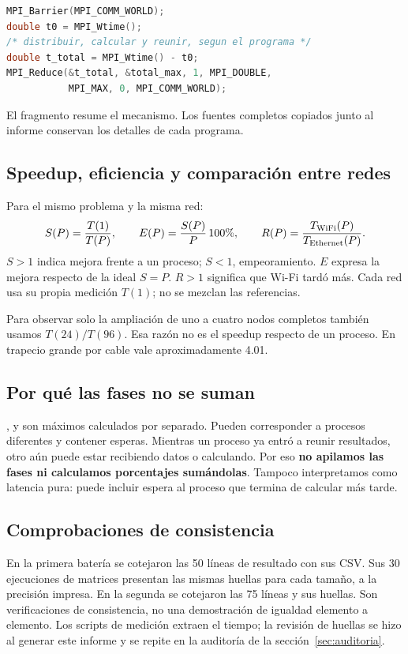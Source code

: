 \begin{lstlisting}[language=C]
MPI_Barrier(MPI_COMM_WORLD);
double t0 = MPI_Wtime();
/* distribuir, calcular y reunir, segun el programa */
double t_total = MPI_Wtime() - t0;
MPI_Reduce(&t_total, &total_max, 1, MPI_DOUBLE,
           MPI_MAX, 0, MPI_COMM_WORLD);
\end{lstlisting}
El fragmento resume el mecanismo. Los fuentes completos copiados junto al informe conservan los detalles de cada programa.

\subsection{Speedup, eficiencia y comparación entre redes}
Para el mismo problema y la misma red:
\[
 S(P)=\frac{T(1)}{T(P)},\qquad
 E(P)=\frac{S(P)}{P}\,100\%,\qquad
 R(P)=\frac{T_{\rm WiFi}(P)}{T_{\rm Ethernet}(P)}.
\]
$S>1$ indica mejora frente a un proceso; $S<1$, empeoramiento. $E$ expresa la mejora respecto de la ideal $S=P$. $R>1$ significa que Wi-Fi tardó más. Cada red usa su propia medición $T(1)$; no se mezclan las referencias.

Para observar solo la ampliación de uno a cuatro nodos completos también usamos $T(24)/T(96)$. Esa razón no es el speedup respecto de un proceso. En trapecio grande por cable vale aproximadamente 4.01.

\subsection{Por qué las fases no se suman}
,  y  son máximos calculados por separado. Pueden corresponder a procesos diferentes y contener esperas. Mientras un proceso ya entró a reunir resultados, otro aún puede estar recibiendo datos o calculando. Por eso \textbf{no apilamos las fases ni calculamos porcentajes sumándolas}. Tampoco interpretamos  como latencia pura: puede incluir espera al proceso que termina de calcular más tarde.

\subsection{Comprobaciones de consistencia}
En la primera batería se cotejaron las 50 líneas de resultado con sus CSV. Sus 30 ejecuciones de matrices presentan las mismas huellas para cada tamaño, a la precisión impresa. En la segunda se cotejaron las 75 líneas y sus huellas. Son verificaciones de consistencia, no una demostración de igualdad elemento a elemento. Los scripts de medición extraen el tiempo; la revisión de huellas se hizo al generar este informe y se repite en la auditoría de la sección~\ref{sec:auditoria}.

